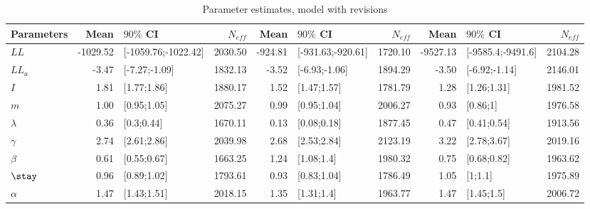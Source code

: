 \begin{table}

\caption{\label{tab:}Parameter estimates, model with revisions}
\centering
\begin{tabular}[t]{lrlrrlrrlr}
\toprule
Parameters & Mean & $90\%$ CI & $N_{eff}$ & Mean & $90\%$ CI & $N_{eff}$ & Mean & $90\%$ CI & $N_{eff}$\\
\midrule
$LL$ & -1029.52 & [-1059.76;-1022.42] & 2030.50 & -924.81 & [-931.63;-920.61] & 1720.10 & -9527.13 & [-9585.4;-9491.6] & 2104.28\\
$LL_a$ & -3.47 & [-7.27;-1.09] & 1832.13 & -3.52 & [-6.93;-1.06] & 1894.29 & -3.50 & [-6.92;-1.14] & 2146.01\\
$I$ & 1.81 & [1.77;1.86] & 1880.17 & 1.52 & [1.47;1.57] & 1781.79 & 1.28 & [1.26;1.31] & 1981.52\\
$m$ & 1.00 & [0.95;1.05] & 2075.27 & 0.99 & [0.95;1.04] & 2006.27 & 0.93 & [0.86;1] & 1976.58\\
$\lambda$ & 0.36 & [0.3;0.44] & 1670.11 & 0.13 & [0.08;0.18] & 1877.45 & 0.47 & [0.41;0.54] & 1913.56\\
\addlinespace
$\gamma$ & 2.74 & [2.61;2.86] & 2039.98 & 2.68 & [2.53;2.84] & 2123.19 & 3.22 & [2.78;3.67] & 2019.16\\
$\beta$ & 0.61 & [0.55;0.67] & 1663.25 & 1.24 & [1.08;1.4] & 1980.32 & 0.75 & [0.68;0.82] & 1963.62\\
$\stay$ & 0.96 & [0.89;1.02] & 1793.61 & 0.93 & [0.83;1.04] & 1786.49 & 1.05 & [1;1.1] & 1975.89\\
$\alpha$ & 1.47 & [1.43;1.51] & 2018.15 & 1.35 & [1.31;1.4] & 1963.77 & 1.47 & [1.45;1.5] & 2006.72\\
\bottomrule
\end{tabular}
\end{table}
